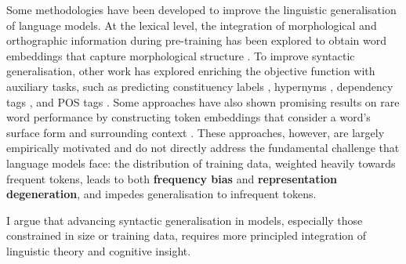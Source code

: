 Some methodologies have been developed to improve the linguistic generalisation of language models. At the lexical level, the integration of morphological and orthographic information during pre-training has been explored to obtain word embeddings that capture morphological structure \citep{salle2018incorporating, vulic2017morphfitting, cotterel2015morphological, bhatia2016morphological, botha2014compositional}. To improve syntactic generalisation, other work has explored enriching the objective function with auxiliary tasks, such as predicting constituency labels \citep{wang2023language}, hypernyms \citep{bai2022better}, dependency tags \citep{cui2022lert}, and POS tags \citep{diehlmartinez2023climb}. Some approaches have also shown promising results on rare word performance by constructing token embeddings that consider a word's surface form and surrounding context \citep{schick2019attentive, schick2020rare}. These approaches, however, are largely empirically motivated and do not directly address the fundamental challenge that language models face: the distribution of training data, weighted heavily towards frequent tokens, leads to both \textbf{frequency bias} and \textbf{representation degeneration}, and impedes generalisation to infrequent tokens.

I argue that advancing syntactic generalisation in models, especially those constrained in size or training data, requires more principled integration of linguistic theory and cognitive insight.




